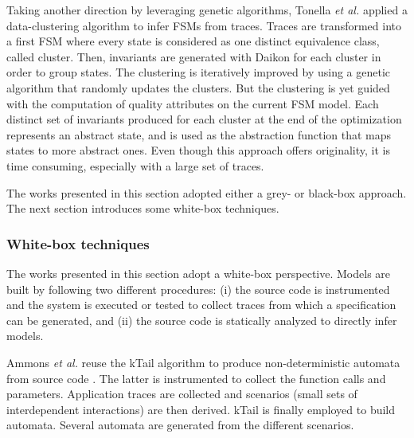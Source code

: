 Taking another direction by leveraging genetic algorithms,
Tonella \emph{et al.} \cite{TonellaNMLH13} applied a data-clustering
algorithm to infer FSMs from traces. Traces are transformed into a
first FSM where every state is considered as one distinct
equivalence class, called cluster. Then, invariants are generated
with Daikon for each cluster in order to group states. The
clustering is iteratively improved by using a genetic algorithm
that randomly updates the clusters. But the clustering is yet
guided with the computation of quality attributes on the current
FSM model. Each distinct set of invariants produced for each
cluster at the end of the optimization represents an abstract
state, and is used as the abstraction function that maps states
to more abstract ones. Even though this approach offers
originality, it is time consuming, especially with a large set of
traces.

The works presented in this section adopted either a grey- or
black-box approach. The next section introduces some white-box
techniques.

\subsubsection{White-box techniques}
\label{sec:passive-white}

The works presented in this section adopt a white-box
perspective. Models are built by following two different
procedures: (i) the source code is instrumented and the system is
executed or tested to collect traces from which a specification
can be generated, and (ii) the source code is statically analyzed
to directly infer models.

Ammons \emph{et al.} reuse the kTail algorithm to produce
non-deterministic automata from source code
\cite{Ammons:2002:MS:565816.503275}. The latter is instrumented
to collect the function calls and parameters.  Application traces
are collected and scenarios (small sets of interdependent
interactions) are then derived. kTail is finally employed to
build automata. Several automata are generated from the different
scenarios.

